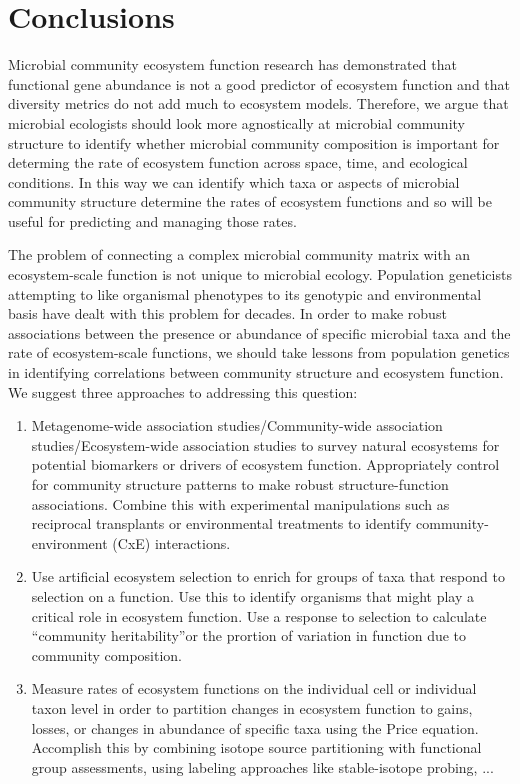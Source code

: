 \documentclass{article}
\begin{document}
\section{Conclusions}
Microbial community ecosystem function research has demonstrated that
functional gene abundance is not a good predictor of ecosystem function and
that diversity metrics do not add much to ecosystem models. Therefore, we
argue that microbial ecologists should look more agnostically at microbial
community structure to identify whether microbial community composition is
important for determing the rate of ecosystem function across space, time,
and ecological conditions. In this way we can identify which taxa or aspects of
microbial community structure determine the rates of ecosystem functions and so
will be useful for predicting and managing those rates. 

The problem of
connecting a complex microbial community matrix with an ecosystem-scale function
is not unique to microbial ecology. Population geneticists attempting to like
organismal phenotypes to its genotypic and environmental basis have dealt with
this problem for decades. In order to make robust associations between the
presence or abundance of specific microbial taxa and the rate of ecosystem-scale
functions, we should take lessons from population genetics in identifying
correlations between community structure and ecosystem function. We suggest
three approaches to addressing this question:

\begin{enumerate}
  \item Metagenome-wide association studies/Community-wide association
    studies/Ecosystem-wide association studies to survey natural ecosystems
    for potential biomarkers or drivers of ecosystem function. Appropriately
    control for community structure patterns to make robust
    structure-function associations. Combine this
    with experimental manipulations such as reciprocal transplants or
    environmental treatments to identify community-environment (CxE)
    interactions.
  \item Use artificial ecosystem selection to enrich for groups of taxa that
    respond to selection on a function. Use this to identify organisms that
    might play a critical role in ecosystem function. Use a response to
    selection to calculate ``community heritability''or the prortion of
    variation in function due to community composition.
  \item Measure rates of ecosystem functions on the individual cell or
    individual taxon level in order to partition changes in ecosystem
    function to gains, losses, or changes in abundance of
    specific taxa using the Price equation. Accomplish this by combining
    isotope source partitioning with functional group assessments, using
    labeling approaches like stable-isotope probing, ...
\end{enumerate}

 

\end{document}
